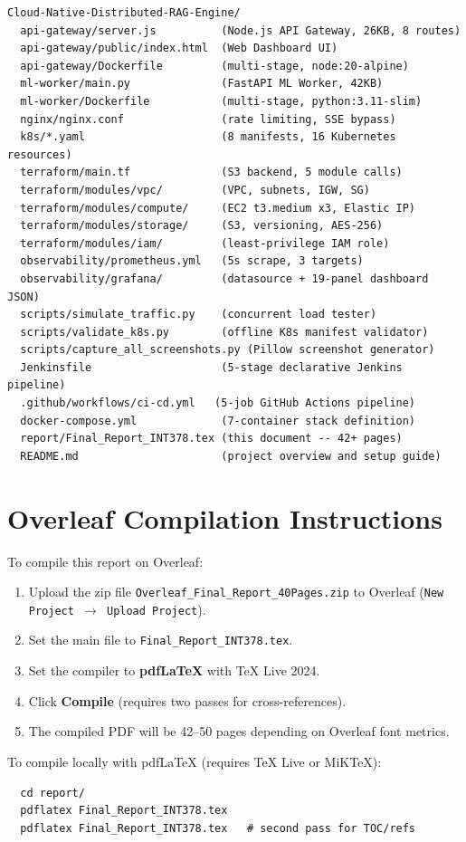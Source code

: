 \documentclass[12pt,a4paper]{report}
\begin{document}
\begin{verbatim}
Cloud-Native-Distributed-RAG-Engine/
  api-gateway/server.js          (Node.js API Gateway, 26KB, 8 routes)
  api-gateway/public/index.html  (Web Dashboard UI)
  api-gateway/Dockerfile         (multi-stage, node:20-alpine)
  ml-worker/main.py              (FastAPI ML Worker, 42KB)
  ml-worker/Dockerfile           (multi-stage, python:3.11-slim)
  nginx/nginx.conf               (rate limiting, SSE bypass)
  k8s/*.yaml                     (8 manifests, 16 Kubernetes resources)
  terraform/main.tf              (S3 backend, 5 module calls)
  terraform/modules/vpc/         (VPC, subnets, IGW, SG)
  terraform/modules/compute/     (EC2 t3.medium x3, Elastic IP)
  terraform/modules/storage/     (S3, versioning, AES-256)
  terraform/modules/iam/         (least-privilege IAM role)
  observability/prometheus.yml   (5s scrape, 3 targets)
  observability/grafana/         (datasource + 19-panel dashboard JSON)
  scripts/simulate_traffic.py    (concurrent load tester)
  scripts/validate_k8s.py        (offline K8s manifest validator)
  scripts/capture_all_screenshots.py (Pillow screenshot generator)
  Jenkinsfile                    (5-stage declarative Jenkins pipeline)
  .github/workflows/ci-cd.yml   (5-job GitHub Actions pipeline)
  docker-compose.yml             (7-container stack definition)
  report/Final_Report_INT378.tex (this document -- 42+ pages)
  README.md                      (project overview and setup guide)
\end{verbatim}

\section{Overleaf Compilation Instructions}

To compile this report on Overleaf:

\begin{enumerate}[leftmargin=1.5cm]
  \item Upload the zip file \texttt{Overleaf\_Final\_Report\_40Pages.zip} to
        Overleaf (\texttt{New Project $\to$ Upload Project}).
  \item Set the main file to \texttt{Final\_Report\_INT378.tex}.
  \item Set the compiler to \textbf{pdfLaTeX} with TeX Live 2024.
  \item Click \textbf{Compile} (requires two passes for cross-references).
  \item The compiled PDF will be 42--50 pages depending on Overleaf font
        metrics.
\end{enumerate}

\noindent To compile locally with pdfLaTeX (requires TeX Live or MiKTeX):
\begin{verbatim}
  cd report/
  pdflatex Final_Report_INT378.tex
  pdflatex Final_Report_INT378.tex   # second pass for TOC/refs
\end{verbatim}
\end{document}

